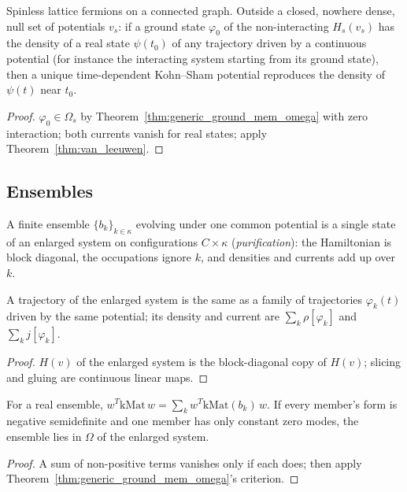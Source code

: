 \begin{theorem}
  \label{thm:td_kohn_sham}
  \leanok
  Spinless lattice fermions on a connected graph. Outside a closed, nowhere dense, null set of potentials $v_s$:
  if a ground state $\varphi_0$ of the non-interacting $H_s(v_s)$ has the density of a real state $\psi(t_0)$ of
  any trajectory driven by a continuous potential (for instance the interacting system starting from its ground
  state), then a unique time-dependent Kohn--Sham potential reproduces the density of $\psi(t)$ near $t_0$.
\end{theorem}
\begin{proof}
  \leanok
  $\varphi_0\in\Omega_s$ by Theorem~\ref{thm:generic_ground_mem_omega} with zero interaction; both currents
  vanish for real states; apply Theorem~\ref{thm:van_leeuwen}.
\end{proof}

\subsection{Ensembles}

A finite ensemble $\{b_k\}_{k\in\kappa}$ evolving under one common potential is a single state of an enlarged system
on configurations $C\times\kappa$ (\emph{purification}): the Hamiltonian is block diagonal, the occupations ignore $k$,
and densities and currents add up over $k$.

\begin{lemma}
  \label{lem:lift}
  \leanok
  A trajectory of the enlarged system is the same as a family of trajectories $\varphi_k(t)$ driven by the same
  potential; its density and current are $\sum_k\rho[\varphi_k]$ and $\sum_kj[\varphi_k]$.
\end{lemma}
\begin{proof}
  \leanok
  $H(v)$ of the enlarged system is the block-diagonal copy of $H(v)$; slicing and gluing are continuous linear maps.
\end{proof}

\begin{lemma}
  \label{lem:mem_omega_glue}
  \leanok
  For a real ensemble, $w^T\mathrm{kMat}\,w=\sum_kw^T\mathrm{kMat}(b_k)\,w$. If every member's form is negative
  semidefinite and one member has only constant zero modes, the ensemble lies in $\Omega$ of the enlarged system.
\end{lemma}
\begin{proof}
  \leanok
  A sum of non-positive terms vanishes only if each does; then apply Theorem~\ref{thm:generic_ground_mem_omega}'s
  criterion.
\end{proof}

